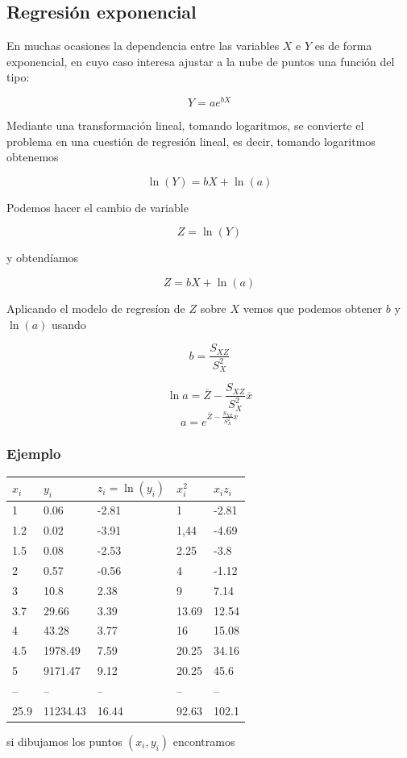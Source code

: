 \documentclass[]{book}
\theoremstyle{plain}
\theoremstyle{definition}
\begin{document}
\hypertarget{regresiuxf3n-exponencial}{%
\subsection{Regresión exponencial}\label{regresiuxf3n-exponencial}}

En muchas ocasiones la dependencia entre las variables \(X\) e \(Y\) es
de forma exponencial, en cuyo caso interesa ajustar a la nube de puntos
una función del tipo:

\[Y=ae^{bX}\]

Mediante una transformación lineal, tomando logaritmos, se convierte el
problema en una cuestión de regresión lineal, es decir, tomando
logaritmos obtenemos

\[\ln {(Y)}=bX+\ln {(a)}\]

Podemos hacer el cambio de variable

\[Z=\ln(Y)\]

y obtendíamos

\[Z = bX + \ln(a)\]

Aplicando el modelo de regresíon de \(Z\) sobre \(X\) vemos que podemos
obtener \(b\) y \(\ln(a)\) usando

\[b = \frac{S_{XZ}}{S^2_X}\]

\[\ln a = \overline{Z} - \frac{S_{XZ}}{S^2_X} \overline x\]
\[a = e^{ \overline{Z} - \frac{S_{XZ}}{S^2_X} \overline x}\]

\hypertarget{ejemplo-4}{%
\subsubsection{Ejemplo}\label{ejemplo-4}}

\begin{longtable}[]{@{}lllll@{}}
\toprule
\(x_i\) & \(y_i\) & \(z_i = \ln(y_i)\) & \(x_i^2\) &
\(x_i z_i\)\tabularnewline
\midrule
\endhead
1 & 0.06 & -2.81 & 1 & -2.81\tabularnewline
1.2 & 0.02 & -3.91 & 1,44 & -4.69\tabularnewline
1.5 & 0.08 & -2.53 & 2.25 & -3.8\tabularnewline
2 & 0.57 & -0.56 & 4 & -1.12\tabularnewline
3 & 10.8 & 2.38 & 9 & 7.14\tabularnewline
3.7 & 29.66 & 3.39 & 13.69 & 12.54\tabularnewline
4 & 43.28 & 3.77 & 16 & 15.08\tabularnewline
4.5 & 1978.49 & 7.59 & 20.25 & 34.16\tabularnewline
5 & 9171.47 & 9.12 & 20.25 & 45.6\tabularnewline
-- & -- & -- & -- & --\tabularnewline
25.9 & 11234.43 & 16.44 & 92.63 & 102.1\tabularnewline
\bottomrule
\end{longtable}

si dibujamos los puntos \((x_i,y_i)\) encontramos
\end{document}
